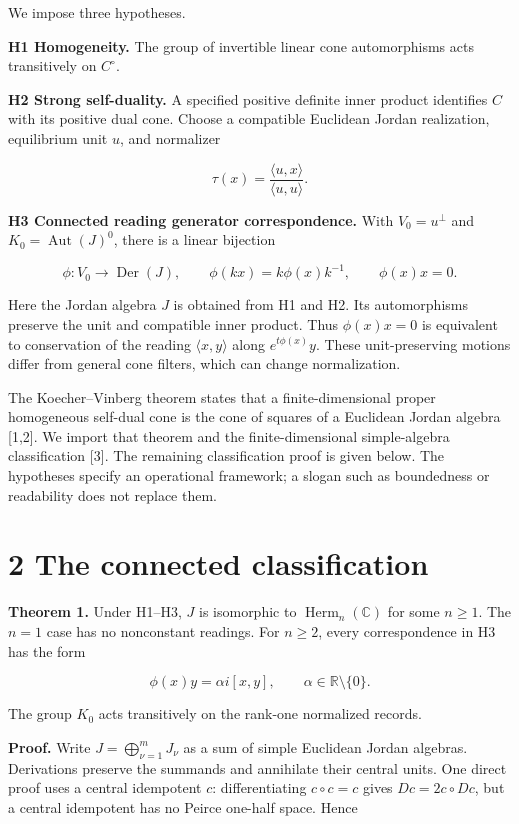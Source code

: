 \documentclass[
  11pt,
  a4paper,
]{article}
\begin{document}
We impose three hypotheses.

\textbf{H1 Homogeneity.} The group of invertible linear cone automorphisms acts transitively on \(C^\circ\).

\textbf{H2 Strong self-duality.} A specified positive definite inner product identifies \(C\) with its positive dual cone. Choose a compatible Euclidean Jordan realization, equilibrium unit \(u\), and normalizer

\[\tau(x)=\frac{\langle u,x\rangle}{\langle u,u\rangle}.\]

\textbf{H3 Connected reading generator correspondence.} With \(V_0=u^\perp\) and \(K_0=\operatorname{Aut}(J)^0\), there is a linear bijection

\[\phi:V_0\longrightarrow\operatorname{Der}(J),\qquad
\phi(kx)=k\phi(x)k^{-1},\qquad \phi(x)x=0.\]

Here the Jordan algebra \(J\) is obtained from H1 and H2. Its automorphisms preserve the unit and compatible inner product. Thus \(\phi(x)x=0\) is equivalent to conservation of the reading \(\langle x,y\rangle\) along \(e^{t\phi(x)}y\). These unit-preserving motions differ from general cone filters, which can change normalization.

The Koecher--Vinberg theorem states that a finite-dimensional proper homogeneous self-dual cone is the cone of squares of a Euclidean Jordan algebra {[}1,2{]}. We import that theorem and the finite-dimensional simple-algebra classification {[}3{]}. The remaining classification proof is given below. The hypotheses specify an operational framework; a slogan such as boundedness or readability does not replace them.

\section{2 The connected classification}\label{the-connected-classification}

\textbf{Theorem 1.} Under H1--H3, \(J\) is isomorphic to \(\operatorname{Herm}_n(\mathbb C)\) for some \(n\ge1\). The \(n=1\) case has no nonconstant readings. For \(n\ge2\), every correspondence in H3 has the form

\[\phi(x)y=\alpha i[x,y],\qquad \alpha\in\mathbb R\setminus\{0\}.\]

The group \(K_0\) acts transitively on the rank-one normalized records.

\textbf{Proof.} Write \(J=\bigoplus_{\nu=1}^mJ_\nu\) as a sum of simple Euclidean Jordan algebras. Derivations preserve the summands and annihilate their central units. One direct proof uses a central idempotent \(c\): differentiating \(c\circ c=c\) gives \(Dc=2c\circ Dc\), but a central idempotent has no Peirce one-half space. Hence
\end{document}
